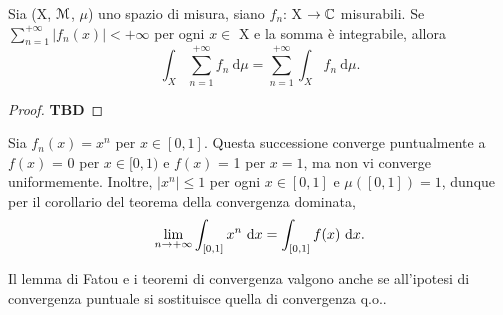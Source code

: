 \documentclass[Completo.tex]{subfiles}
\begin{document}
	\begin{Cor}
		Sia (X, $\eu[M]$, $\mu$) uno spazio di misura, siano $f_n$: X $\ra \bb[C]$ misurabili. Se $\sum_{n=1}^{+\infty} \vert f_n(x) \vert < +\infty$ per ogni $x \in$ X e la somma è integrabile, allora
		\begin{equation*}
		\int_X \sum\limits_{n=1}^{+\infty} f_n \ \mathrm{d}\mu = \sum\limits_{n=1}^{+\infty} \int_X f_n \ \mathrm{d}\mu.
		\end{equation*}
	\end{Cor}
	\begin{proof}
		\textbf{TBD}
	\end{proof}
	\begin{Ex}
		Sia $f_n(x) = x^n$ per $x \in [0,1]$. Questa successione converge puntualmente a $f(x)$ = 0 per $x \in [0,1)$ e $f(x)$ = 1 per $x = 1$, ma non vi converge uniformemente. Inoltre, $\vert x^n \vert \leq 1$ per ogni $x \in [0,1]$ e $\mu([0,1]) = 1$, dunque per il corollario del teorema della convergenza dominata,
		\begin{equation*}
		\lim_{n \ra +\infty} \int_{[0,1]} x^n \ \mathrm{d}x = \int_{[0,1]} f(x) \ \mathrm{d}x.
		\end{equation*}
	\end{Ex}
	
	\begin{Rem}
		Il lemma di Fatou e i teoremi di convergenza valgono anche se all'ipotesi di convergenza puntuale si sostituisce quella di convergenza q.o..
	\end{Rem}
	
\end{document}
